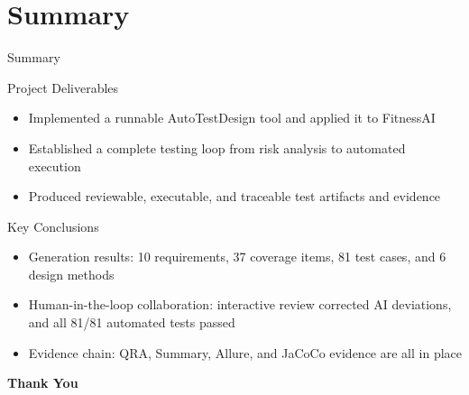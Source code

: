 %
%
%
%
\section{Summary}

\begin{frame}{Summary}
    \footnotesize
    \begin{block}{Project Deliverables}
        \begin{itemize}
            \item Implemented a runnable AutoTestDesign tool and applied it to FitnessAI
            \item Established a complete testing loop from risk analysis to automated execution
            \item Produced reviewable, executable, and traceable test artifacts and evidence
        \end{itemize}
    \end{block}

    \begin{block}{Key Conclusions}
        \begin{itemize}
            \item Generation results: 10 requirements, 37 coverage items, 81 test cases, and 6 design methods
            \item Human-in-the-loop collaboration: interactive review corrected AI deviations, and all 81/81 automated tests passed
            \item Evidence chain: QRA, Summary, Allure, and JaCoCo evidence are all in place
        \end{itemize}
    \end{block}
\end{frame}

\begin{frame}
    \begin{center}
        \Huge\bfseries Thank You
    \end{center}
\end{frame}
